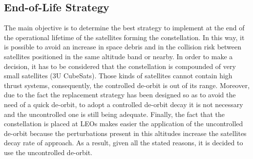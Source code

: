\subsection{End-of-Life Strategy}

The main objective is to determine the best strategy to implement at the end of the operational lifetime of the satellites forming the constellation. In this way, it is possible to avoid an increase in space debris and in the collision risk between satellites positioned in the same altitude band or nearby.
\newline
In order to make a decision, it has to be considered that the constellation is compounded of very small satellites (3U CubeSats). Those kinds of satellites cannot contain high thrust systems, consequently, the controlled de-orbit is out of its range. Moreover, due to the fact the replacement strategy has been designed so as to avoid the need of a quick de-orbit, to adopt a controlled de-orbit decay it is not necessary and the uncontrolled one is still being adequate. Finally, the fact that the constellation is placed at LEOs makes easier the application of the uncontrolled de-orbit because the perturbations present in this altitudes increase the satellites decay rate of approach. As a result, given all the stated reasons, it is decided to use the uncontrolled de-orbit. 


